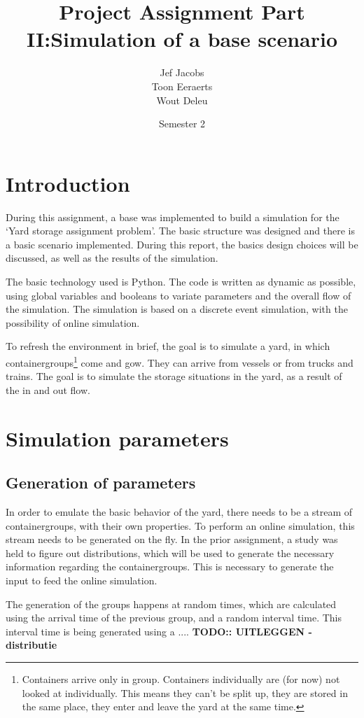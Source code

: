 \documentclass[]{article}
\title{Project Assignment Part II:\@ Simulation of a base scenario }
\author{Jef Jacobs \\ Toon Eeraerts \\ Wout Deleu}
\date{Semester 2}
\begin{document}
\setlength{\parindent}{0pt} \maketitle \tableofcontents \newpage %

\section{Introduction}
During this assignment, a base was implemented to build a simulation for the
`Yard storage assignment problem'. The basic structure was designed and there
is a basic scenario implemented. During this report, the basics design choices
will be discussed, as well as the results of the simulation.

The basic technology used is Python. The code is written as dynamic as
possible, using global variables and booleans to variate parameters and the
overall flow of the simulation. The simulation is based on a discrete event
simulation, with the possibility of online simulation.

To refresh the environment in brief, the goal is to simulate a yard, in which
containergroups\footnote{Containers arrive only in group. Containers
      individually are (for now) not looked at individually. This means they can't be
      split up, they are stored in the same place, they enter and leave the yard at
      the same time.} come and gow. They can arrive from vessels or from trucks and
trains. The goal is to simulate the storage situations in the yard, as a result
of the in and out flow.

\section{Simulation parameters}
\subsection{Generation of parameters}
In order to emulate the basic behavior of the yard, there needs to be a stream
of containergroups, with their own properties. To perform an online simulation,
this stream needs to be generated on the fly. In the prior assignment, a study
was held to figure out distributions, which will be used to generate the
necessary information regarding the containergroups. This is necessary to
generate the input to feed the online simulation.

The generation of the groups happens at random times, which are calculated
using the arrival time of the previous group, and a random interval time. This
interval time is being generated using a .... \textbf{TODO:: UITLEGGEN -
      distributie}
\end{document}
